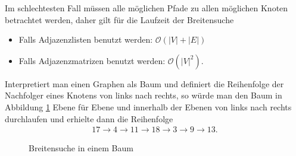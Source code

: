 \begin{proposition}[Laufzeit]
  Im schlechtesten Fall müssen alle möglichen Pfade zu allen möglichen
  Knoten betrachtet werden, daher gilt für die Laufzeit der
  Breitensuche
  \begin{itemize}
  \item Falls Adjazenzlisten benutzt werden: $\mathcal{O}(|V| + |E|)$
  \item Falls Adjazenzmatrizen benutzt werden: $\mathcal{O}(|V|^2)$.
  \end{itemize}
\end{proposition}

\begin{bsp}
  Interpretiert man einen Graphen als Baum und definiert die
  Reihenfolge der Nachfolger eines Knotens von links nach rechts, so
  würde man den Baum in Abbildung \ref{bfstree} Ebene für Ebene und
  innerhalb der Ebenen von links nach rechts durchlaufen und erhielte
  dann die Reihenfolge
  \begin{gather*}
    17 \rightarrow 4 \rightarrow 11 \rightarrow 18 \rightarrow 3
    \rightarrow 9 \rightarrow 13 .
  \end{gather*}
\end{bsp}

\begin{figure}[!h]
  \centering
              \caption{Breitensuche in einem Baum}
              \label{bfstree}
            \end{figure}
